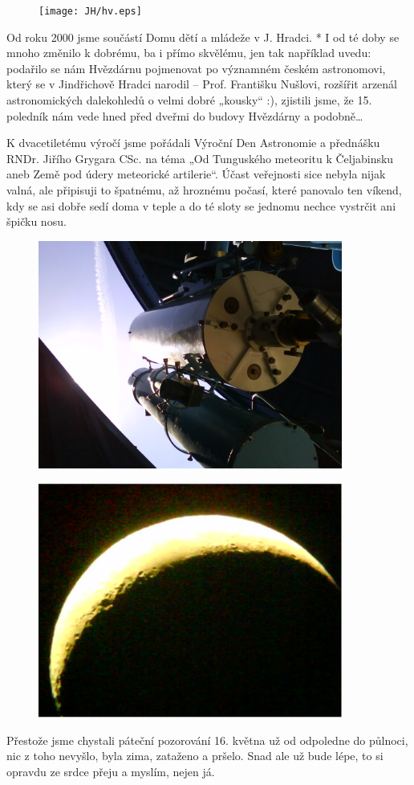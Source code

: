 \documentclass[10pt,a5paper,twoside]{book}
\begin{document}
\begin{figure}[htbp]
 \centering
  \texttt{[image: JH/hv.eps]}
\end{figure}

Od roku 2000 jsme součástí Domu dětí a mládeže v J. Hradci. *  
I od té doby se mnoho změnilo k dobrému, ba i přímo skvělému, jen tak například uvedu: podařilo se nám Hvězdárnu pojmenovat po významném českém astronomovi, který se v Jindřichově Hradci narodil – Prof. Františku Nušlovi,  rozšířit arzenál astronomických dalekohledů o velmi dobré „kousky“ :), zjistili jsme, že 15. poledník nám vede hned před dveřmi do budovy Hvězdárny a podobně…

K dvacetiletému výročí jsme pořádali Výroční Den Astronomie a přednášku RNDr. Jiřího Grygara CSc. na téma „Od Tunguského meteoritu k Čeljabinsku aneb Země pod údery meteorické artilerie“.  Účast veřejnosti sice nebyla nijak valná, ale připisuji to špatnému, až hroznému počasí, které panovalo ten víkend, kdy se asi dobře sedí doma v teple a do té sloty se jednomu nechce vystrčit ani špičku nosu. 
\begin{figure}[htbp]
 \centering
  \includegraphics*[width=10cm]{JH/dale.eps}
\end{figure}
\begin{figure}[htbp]
 \centering
  \includegraphics*[width=10cm]{JH/moon.eps}
\end{figure}

Přestože jsme chystali páteční pozorování 16. května už od odpoledne do půlnoci, nic z toho nevyšlo, byla zima, zataženo a pršelo.
Snad ale už bude lépe, to si opravdu ze srdce přeju a myslím, nejen já.
\end{document}
